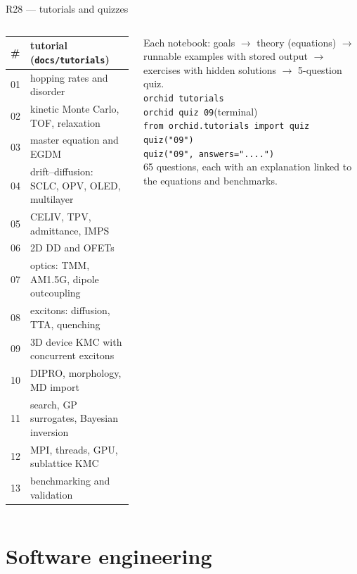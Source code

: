 \documentclass[aspectratio=169,10pt]{beamer}
\begin{document}
\begin{frame}{R28 --- tutorials and quizzes}
\begin{columns}[T]
\scriptsize
\begin{tabular}{@{}ll@{}}
\toprule
\# & tutorial (\texttt{docs/tutorials})\\
\midrule
01 & hopping rates and disorder\\
02 & kinetic Monte Carlo, TOF, relaxation\\
03 & master equation and EGDM\\
04 & drift--diffusion: SCLC, OPV, OLED, multilayer\\
05 & CELIV, TPV, admittance, IMPS\\
06 & 2D DD and OFETs\\
07 & optics: TMM, AM1.5G, dipole outcoupling\\
08 & excitons: diffusion, TTA, quenching\\
09 & 3D device KMC with concurrent excitons\\
10 & DIPRO, morphology, MD import\\
11 & search, GP surrogates, Bayesian inversion\\
12 & MPI, threads, GPU, sublattice KMC\\
13 & benchmarking and validation\\
\bottomrule
\end{tabular}
\small
Each notebook: goals $\to$ theory (equations) $\to$ runnable examples with stored output $\to$ exercises with hidden solutions $\to$ \alert{5-question quiz}.\\[2mm]
\scriptsize
\texttt{orchid tutorials}\\
\texttt{orchid quiz 09}\hfill(terminal)\\[1mm]
\texttt{from orchid.tutorials import quiz}\\
\texttt{quiz("09")}\\
\texttt{quiz("09", answers="....")}\\[2mm]
\small 65 questions, each with an explanation linked to the equations and benchmarks.
\end{columns}
\end{frame}

\section{Software engineering}
\end{document}
